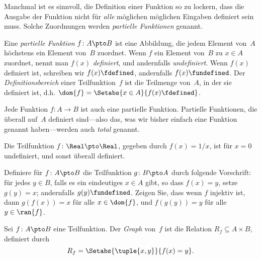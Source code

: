 \documentclass[../../../include/open-logic-section]{subfiles}
\begin{document}


\begin{explain}
Manchmal ist es sinnvoll, die Definition einer Funktion so zu lockern,
dass die Ausgabe der Funktion nicht für \emph{alle} möglichen
möglichen Eingaben definiert sein muss. Solche Zuordnungen werden \emph{partielle Funktionen} genannt.
\end{explain}

\begin{defn}
Eine \emph{partielle Funktion} $f \colon A \pto B$ ist eine Abbildung, die
jedem Element von~$A$ höchstens ein Element von~$B$ zuordnet.
Wenn $f$ ein Element von~$B$ zu $x \in A$ zuordnet, nennt man $f(x)$
\emph{definiert}, und andernfalls \emph{undefiniert}. Wenn $f(x)$ definiert ist,
schreiben wir $f(x) \fdefined$, andernfalls $f(x) \fundefined$. Der
\emph{Definitionsbereich} einer Teilfunktion~$f$ ist die Teilmenge von~$A$, in der sie
definiert ist, d.h. $\dom{f} = \Setabs{x \in A}{f(x) \fdefined}$.
\end{defn}

\begin{ex}
Jede Funktion $f \colon A \to B$ ist auch eine partielle Funktion. Partielle
Funktionen, die überall auf~$A$ definiert sind---also das, was wir bisher
einfach eine Funktion genannt haben---werden auch \emph{total}
genannt.
\end{ex}

\begin{ex}
Die Teilfunktion $f \colon \Real \pto \Real$, gegeben durch $f(x) = 1/x$,
ist für $x = 0$ undefiniert, und sonst überall definiert.
\end{ex}

\begin{prob}
Definiere für $f\colon A \pto B$ die Teilfunktion $g\colon B \pto
A$ durch folgende Vorschrift: für jedes $y \in B$, falls es ein eindeutiges $x \in A$ gibt,
so dass $f(x) = y$, setze $g(y) = x$; andernfalls $g(y) \fundefined$.  Zeigen Sie, dass
wenn $f$ injektiv ist, dann $g(f(x)) = x$ für alle $x \in \dom{f}$, und
$f(g(y)) = y$ für alle $y \in \ran{f}$.
\end{prob}

\begin{defn}
Sei $f\colon A \pto B$ eine Teilfunktion. Der \emph{Graph} von~$f$
ist die Relation $R_f \subseteq A \times B$, definiert durch
\[
R_f = \Setabs{\tuple{x,y}}{f(x) = y}.
\]
\end{defn}
\end{document}
